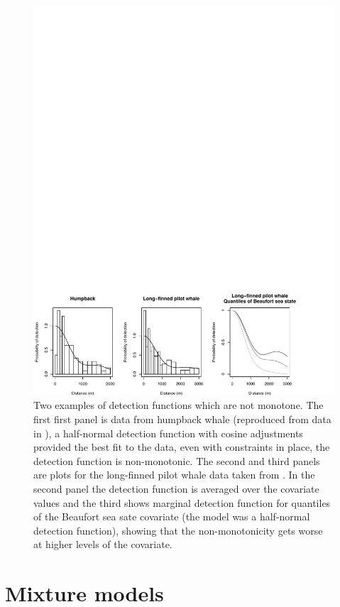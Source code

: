 \begin{figure}
\centering
\includegraphics[width=\textwidth]{mix/figs/figure1.pdf}
\caption{Two examples of detection functions which are not monotone. The first first panel is data from humpback whale (reproduced from data in ), a half-normal detection function with cosine adjustments provided the best fit to the data, even with constraints in place, the detection function is non-monotonic. The second and third panels are plots for the long-finned pilot whale data taken from \cite{pike}. In the second panel the detection function is averaged over the covariate values and the third shows marginal detection function for quantiles of the Beaufort sea sate covariate (the model was a half-normal detection function), showing that the non-monotonicity gets worse at higher levels of the covariate.}
\label{fig1}
\end{figure}

\section{Mixture models}

